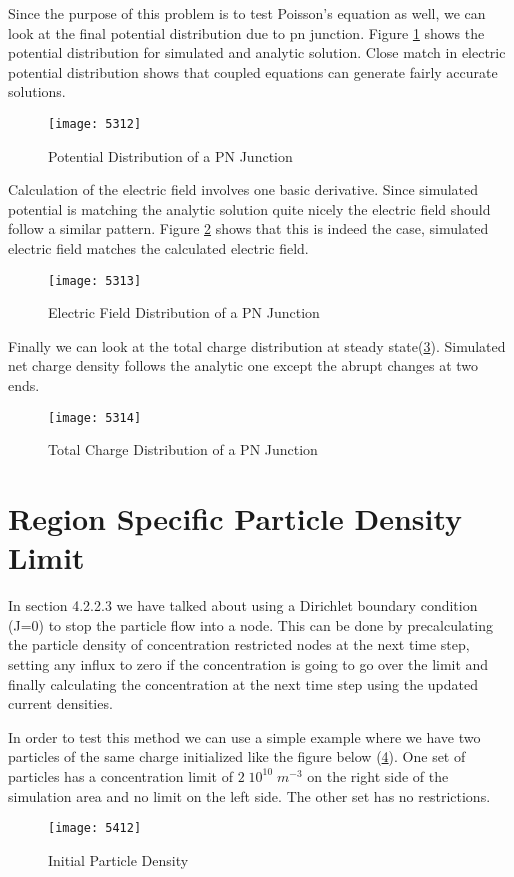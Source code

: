 Since the purpose of this problem is to test Poisson's equation as well, we can look at the final potential distribution due to pn junction. Figure \ref{pnpot} shows the potential distribution for simulated and analytic solution. Close match in electric potential distribution shows that coupled equations can generate fairly accurate solutions.
 
\begin{figure}[!htp]
\centering
\texttt{[image: 5312]}
\caption{Potential Distribution of a PN Junction} 
\label{pnpot}
\end{figure}

Calculation of the electric field involves one basic derivative. Since simulated potential is matching the analytic solution quite nicely the electric field should follow a similar pattern. Figure \ref{pnefield} shows that this is indeed the case, simulated electric field matches the calculated electric field.
\begin{figure}[!htp]
\centering
\texttt{[image: 5313]}
\caption{Electric Field Distribution of a PN Junction} 
\label{pnefield}
\end{figure}

Finally we can look at the total charge distribution at steady state(\ref{pncd}). Simulated net charge density follows the analytic one except the abrupt changes at two ends. 
\begin{figure}
\centering
\texttt{[image: 5314]}
\caption{Total Charge Distribution of a PN Junction} 
\label{pncd}
\end{figure}




\clearpage
\section{Region Specific Particle Density Limit}

In section 4.2.2.3 we have talked about using a Dirichlet boundary condition (J=0) to stop the particle flow into a node. This can be done by precalculating the particle density of concentration restricted nodes at the next time step, setting any influx to zero if the concentration is going to go over the limit and finally calculating the concentration at the next time step using the updated current densities. 

In order to test this method we can use a simple example where we have two particles of the same charge initialized like the figure below (\ref{5412}). One set of particles has a concentration limit of $2 \; 10^{10} \; m^{-3}$ on the right side of the simulation area and no limit on the left side. The other set has no restrictions.
\begin{figure}[!htp]
\centering
\texttt{[image: 5412]}
\caption{Initial Particle Density} 
\label{5412}
\end{figure}

